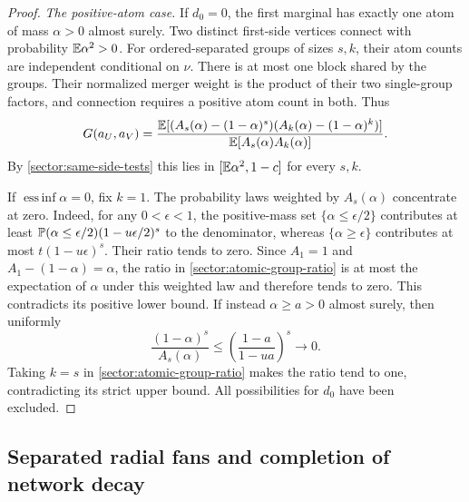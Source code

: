 \begin{proof}
\emph{The positive-atom case.}
If $d_0=0$, the first marginal has exactly one atom of mass
$\alpha>0$ almost surely.  Two distinct first-side vertices connect
with probability $\mathbb E\alpha^2>0$.  For ordered-separated groups of
sizes $s,k$, their atom counts are independent conditional on $\nu$.
There is at most one block shared by the groups.  Their normalized
merger weight is the product of their two single-group factors, and
connection requires a positive atom count in both.  Thus
\begin{equation}\label{sector:atomic-group-ratio}
 G(a_U,a_V)=
 \frac{\mathbb E[(A_s(\alpha)-(1-\alpha)^s)
                (A_k(\alpha)-(1-\alpha)^k)]}
      {\mathbb E[A_s(\alpha)A_k(\alpha)]}.
\end{equation}
By \eqref{sector:same-side-tests} this lies in
$[\mathbb E\alpha^2,1-c]$ for every $s,k$.

If $\operatorname{ess\,inf}\alpha=0$, fix $k=1$.
The probability laws weighted by $A_s(\alpha)$ concentrate at zero.
Indeed, for any $0<\epsilon<1$, the positive-mass set
$\{\alpha\leq\epsilon/2\}$ contributes at least
$\mathbb P(\alpha\leq\epsilon/2)(1-u\epsilon/2)^s$ to the denominator,
whereas $\{\alpha\geq\epsilon\}$ contributes at most
$t(1-u\epsilon)^s$.  Their ratio tends to zero.
Since $A_1=1$ and $A_1-(1-\alpha)=\alpha$, the ratio in
\eqref{sector:atomic-group-ratio} is at most the expectation of
$\alpha$ under this weighted law and therefore tends to zero.
This contradicts its positive lower bound.
If instead $\alpha\geq a>0$ almost surely, then uniformly
\[
 \frac{(1-\alpha)^s}{A_s(\alpha)}
 \leq\left(\frac{1-a}{1-ua}\right)^s\longrightarrow0.
\]
Taking $k=s$ in \eqref{sector:atomic-group-ratio} makes the ratio tend
to one, contradicting its strict upper bound.  All possibilities for
$d_0$ have been excluded.
\end{proof}

\subsection{Separated radial fans and completion of network decay}
\label{sector:fan-comparison}

